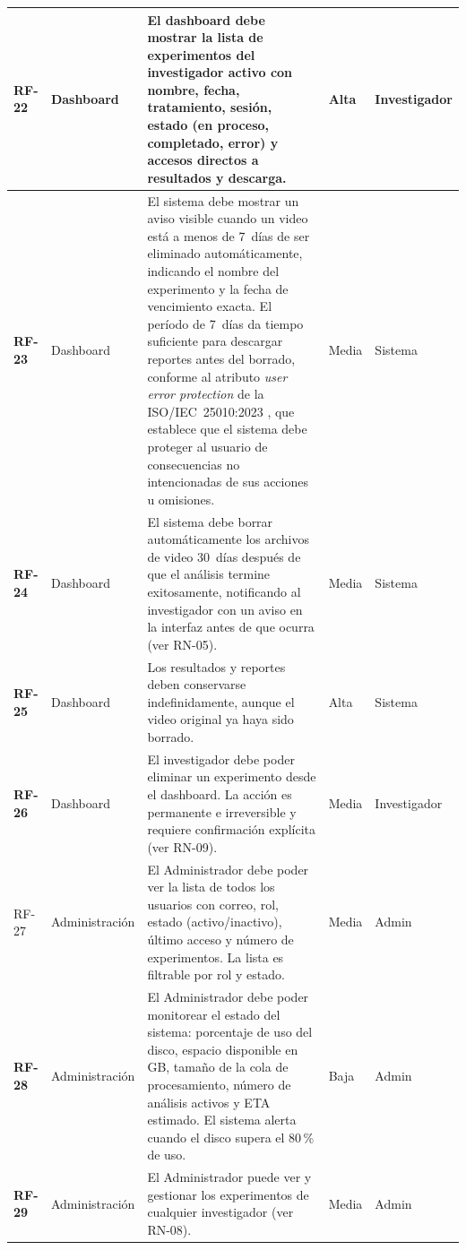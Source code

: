 \begin{longtable}{|>{\bfseries}p{1.1cm}|p{2.0cm}|p{6.7cm}|p{1.3cm}|p{1.7cm}|}
RF-22 & Dashboard
      & El dashboard debe mostrar la lista de experimentos del investigador activo
        con nombre, fecha, tratamiento, sesión, estado (en proceso, completado, error)
        y accesos directos a resultados y descarga.
      & Alta & Investigador \\
\hline
RF-23 & Dashboard
      & El sistema debe mostrar un aviso visible cuando un video está a menos de
        7~días de ser eliminado automáticamente, indicando el nombre del experimento
        y la fecha de vencimiento exacta. El período de 7~días da tiempo suficiente
        para descargar reportes antes del borrado, conforme al atributo
        \textit{user error protection} de la ISO/IEC~25010:2023 \cite{iso25010},
        que establece que el sistema debe proteger al usuario de consecuencias
        no intencionadas de sus acciones u omisiones.
      & Media & Sistema \\
\hline
RF-24 & Dashboard
      & El sistema debe borrar automáticamente los archivos de video 30~días después
        de que el análisis termine exitosamente, notificando al investigador con un
        aviso en la interfaz antes de que ocurra (ver RN-05).
      & Media & Sistema \\
\hline
RF-25 & Dashboard
      & Los resultados y reportes deben conservarse indefinidamente, aunque el video
        original ya haya sido borrado.
      & Alta & Sistema \\
\hline
RF-26 & Dashboard
      & El investigador debe poder eliminar un experimento desde el dashboard. La
        acción es permanente e irreversible y requiere confirmación explícita (ver
        RN-09).
      & Media & Investigador \\
\hline

RF-27 & Administración
      & El Administrador debe poder ver la lista de todos los usuarios con correo,
        rol, estado (activo/inactivo), último acceso y número de experimentos. La
        lista es filtrable por rol y estado.
      & Media & Admin \\
\hline
RF-28 & Administración
      & El Administrador debe poder monitorear el estado del sistema: porcentaje de
        uso del disco, espacio disponible en GB, tamaño de la cola de procesamiento,
        número de análisis activos y ETA estimado. El sistema alerta cuando el disco
        supera el 80\,\% de uso.
      & Baja & Admin \\
\hline
RF-29 & Administración
      & El Administrador puede ver y gestionar los experimentos de cualquier
        investigador (ver RN-08).
      & Media & Admin \\
\hline

\end{longtable}

